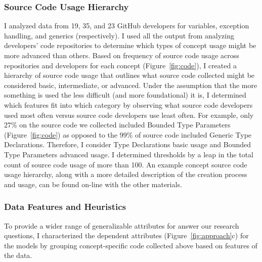 \subsubsection{Source Code Usage Hierarchy}
I analyzed data from 19, 35, and 23 GitHub developers for variables, exception handling, and generics (respectively).
I used all the output from analyzing developers' code repositories to determine which types of concept usage might be more advanced than others. 
Based on frequency of source code usage across repositories and developers for each concept (Figure~\ref{fig:code}), I created a hierarchy of source code usage that outlines what source code collected might be considered basic, intermediate, or advanced. 
Under the assumption that the more something is used the less difficult (and more foundational) it is, I determined which features fit into which category by observing what source code developers used most often versus source code developers use least often. 
For example, only 27\% on the source code we collected included Bounded Type Parameters (Figure~\ref{fig:code}) as opposed to the 99\% of source code included Generic Type Declarations. Therefore, I consider Type Declarations basic usage and Bounded Type Parameters advanced usage. 
I determined thresholds by a leap in the total count of source code usage of more than 100.	
An example concept source code usage hierarchy, along with a more detailed description of the creation process and usage, can be found on-line with the other materials.


\subsubsection{Data Features and Heuristics}\label{subsec:prep}

To provide a wider range of generalizable attributes for answer our research questions, I characterized the dependent attributes (Figure~\ref{fig:approach}c) for the models by grouping concept-specific code collected above based on features of the data. 

